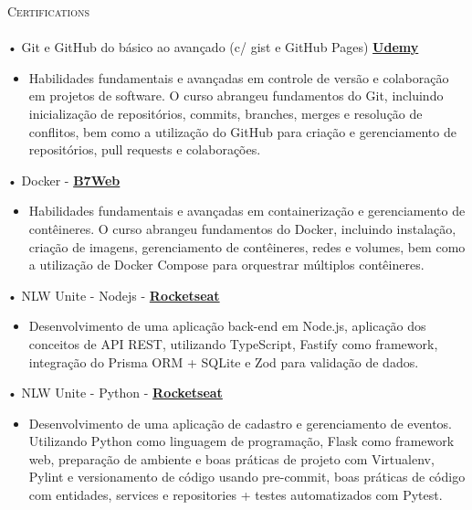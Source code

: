 \documentclass[a4paper]{article}
\newcommand{\lineunder} {
    \vspace*{-8pt} \\
    \hspace*{-18pt} \hrulefill \\
}
\newcommand{\header} [1] {
    {\hspace*{-18pt}\vspace*{6pt} \textsc{#1}}
    \vspace*{-6pt} \lineunder
}
\begin{document}
\vspace*{3mm}

%
%
\header{Certifications}
\vspace{2mm}
• Git e GitHub do básico ao avançado (c/ gist e GitHub Pages) \textbf{\href{https://www.udemy.com/certificate/UC-db57cce7-1471-47ff-9828-0e3a4d7da628/}{Udemy}}\\
\begin{itemize}
    \item [] Habilidades fundamentais e avançadas em controle de versão e colaboração em projetos de software. O curso abrangeu fundamentos do Git, incluindo inicialização de repositórios, commits, branches, merges e resolução de conflitos,
          bem como a utilização do GitHub para criação e gerenciamento de repositórios, pull requests e colaborações.
\end{itemize}
\vspace*{1mm}
• Docker - \textbf{\href{https://drive.google.com/drive/folders/1YKThgvnT5h1bA_Hb0uDiIf7p8Qiph-NC}{B7Web}}\\
\begin{itemize}
    \item [] Habilidades fundamentais e avançadas em containerização e gerenciamento de contêineres. O curso abrangeu fundamentos do Docker, incluindo instalação, criação de imagens, gerenciamento de contêineres, redes e volumes, bem como a utilização de
          Docker Compose para orquestrar múltiplos contêineres.
\end{itemize}
\vspace*{1mm}
• NLW Unite - Nodejs - \textbf{\href{https://app.rocketseat.com.br/certificates/a53012ec-27a9-419e-9a8c-86f28508a406}{Rocketseat}}\\
\begin{itemize}
    \item [] Desenvolvimento de uma aplicação back-end em Node.js, aplicação dos conceitos de API REST, utilizando TypeScript, Fastify como framework, integração do Prisma ORM + SQLite e Zod para validação de dados.
\end{itemize}
\vspace*{1mm}
• NLW Unite - Python - \textbf{\href{https://app.rocketseat.com.br/certificates/c5f21b9b-53c5-4ed7-bc45-430d87cccf77}{Rocketseat}}\\
\begin{itemize}
    \item [] Desenvolvimento de uma aplicação de cadastro e gerenciamento de eventos. Utilizando Python como linguagem de programação, Flask como framework web, preparação de ambiente e boas práticas de projeto com Virtualenv, Pylint e versionamento de código usando pre-commit, boas práticas de código com entidades, services e repositories + testes automatizados com Pytest.
\end{itemize}
\end{document}
